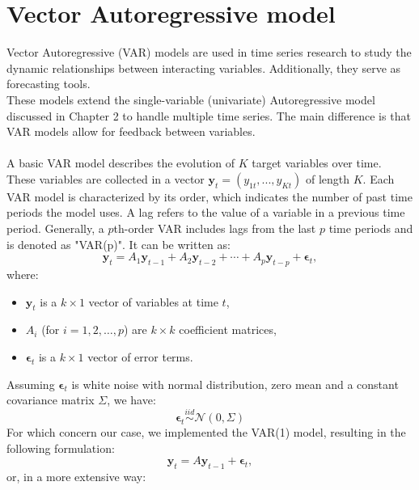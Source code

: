 \section{Vector Autoregressive model}
\label{sec:VAR}
Vector Autoregressive (VAR) models are used in time series research to study the dynamic relationships between interacting variables. Additionally, they serve as forecasting tools. \\
These models extend the single-variable (univariate) Autoregressive model discussed in Chapter 2 to handle multiple time series. The main difference is that VAR models allow for feedback between variables.\\\\
A basic VAR model describes the evolution of $K$ target variables over time. These variables are collected in a vector $\mathbf{y}_t = (y_{1t}, ..., y_{Kt})$ of length $K$. Each VAR model is characterized by its order, which indicates the number of past time periods the model uses. A lag refers to the value of a variable in a previous time period. Generally, a $p$th-order VAR includes lags from the last $p$ time periods and is denoted as "VAR(p)". It can be written as:
\begin{equation}
    \mathbf{y}_t = A_1 \mathbf{y}_{t-1} + A_2 \mathbf{y}_{t-2} + \cdots + A_p \mathbf{y}_{t-p} + \mathbf{\epsilon}_t,
\end{equation}
where:
\begin{itemize}
    \item \(\mathbf{y}_t\) is a \(k \times 1\) vector of variables at time \(t\),
    \item \(A_i\) (for \(i = 1, 2, \ldots, p\)) are \(k \times k\) coefficient matrices,
    \item \(\mathbf{\epsilon}_t\) is a \(k \times 1\) vector of error terms.
\end{itemize}
Assuming \(\mathbf{\epsilon}_t\) is white noise with normal distribution, zero mean and a constant covariance matrix \(\Sigma\), we have:
\begin{equation}
    \mathbf{\epsilon}_t \stackrel{iid} \sim \mathcal{N}(0, \Sigma)
\end{equation}
For which concern our case, we implemented the VAR(1) model, resulting in the following formulation:
\begin{equation}
    \mathbf{y}_t = A \mathbf{y}_{t-1} + \mathbf{\epsilon}_t,
\end{equation}
or, in a more extensive way:
